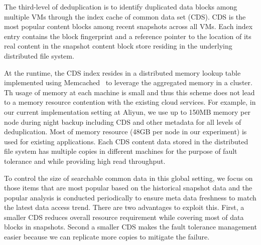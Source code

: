 The third-level of deduplication is to identify duplicated data blocks among multiple VMs through the index cache
of common data set (CDS).  CDS is the most popular content blocks 
among  recent snapshots across all VMs. 
Each index entry contains  the block fingerprint and a reference pointer to the location of its real content
in the snapshot content block store residing in the underlying distributed file system.

At the runtime, the CDS index resides in a distributed  memory lookup table  
implemented using Memcached~\cite{memcached} to leverage the aggregated memory in a cluster.
Th usage of memory at each machine is small and thus  this scheme  does not
lead to  a memory resource contention with the existing cloud services.
For example, in our current implementation setting at Aliyun, we use up to  150MB memory per node during night backup
including CDS and other metadata for all levels of deduplication. Most of memory resource (48GB per node 
in our experiment) is used for existing  applications.
Each CDS content data stored  in the distributed file system
has multiple copies in different machines for the purpose of fault tolerance and 
while providing high read  throughput.  



To control the size of searchable common data in this global setting, we focus on those items that 
are most popular based on the historical snapshot data and the popular analysis is conducted periodically to ensure 
meta data freshness to match the latest data access trend.
There are two advantages to exploit this.
First, a smaller CDS reduces overall resource requirement while covering  most of data blocks in snapshots.
Second a smaller CDS makes the fault tolerance management  easier because we can replicate  more copies
to mitigate the failure.


